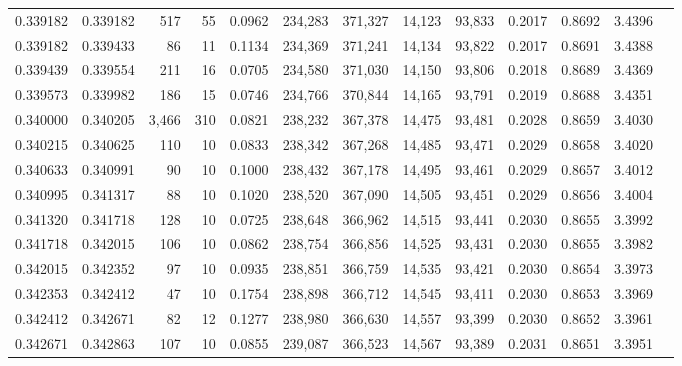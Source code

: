\begin{tabular}{rrrrrrrrrrrrr}
0.339182 & 0.339182 &   517 &  55 &                                     0.0962 & 234,283 & 371,327 &  14,123 &  93,833 & 0.2017 & 0.8692 & 3.4396 \\
0.339182 & 0.339433 &    86 &  11 &                                     0.1134 & 234,369 & 371,241 &  14,134 &  93,822 & 0.2017 & 0.8691 & 3.4388 \\
0.339439 & 0.339554 &   211 &  16 &                                     0.0705 & 234,580 & 371,030 &  14,150 &  93,806 & 0.2018 & 0.8689 & 3.4369 \\
0.339573 & 0.339982 &   186 &  15 &                                     0.0746 & 234,766 & 370,844 &  14,165 &  93,791 & 0.2019 & 0.8688 & 3.4351 \\
0.340000 & 0.340205 & 3,466 & 310 &                                     0.0821 & 238,232 & 367,378 &  14,475 &  93,481 & 0.2028 & 0.8659 & 3.4030 \\
0.340215 & 0.340625 &   110 &  10 &                                     0.0833 & 238,342 & 367,268 &  14,485 &  93,471 & 0.2029 & 0.8658 & 3.4020 \\
0.340633 & 0.340991 &    90 &  10 &                                     0.1000 & 238,432 & 367,178 &  14,495 &  93,461 & 0.2029 & 0.8657 & 3.4012 \\
0.340995 & 0.341317 &    88 &  10 &                                     0.1020 & 238,520 & 367,090 &  14,505 &  93,451 & 0.2029 & 0.8656 & 3.4004 \\
0.341320 & 0.341718 &   128 &  10 &                                     0.0725 & 238,648 & 366,962 &  14,515 &  93,441 & 0.2030 & 0.8655 & 3.3992 \\
0.341718 & 0.342015 &   106 &  10 &                                     0.0862 & 238,754 & 366,856 &  14,525 &  93,431 & 0.2030 & 0.8655 & 3.3982 \\
0.342015 & 0.342352 &    97 &  10 &                                     0.0935 & 238,851 & 366,759 &  14,535 &  93,421 & 0.2030 & 0.8654 & 3.3973 \\
0.342353 & 0.342412 &    47 &  10 &                                     0.1754 & 238,898 & 366,712 &  14,545 &  93,411 & 0.2030 & 0.8653 & 3.3969 \\
0.342412 & 0.342671 &    82 &  12 &                                     0.1277 & 238,980 & 366,630 &  14,557 &  93,399 & 0.2030 & 0.8652 & 3.3961 \\
0.342671 & 0.342863 &   107 &  10 &                                     0.0855 & 239,087 & 366,523 &  14,567 &  93,389 & 0.2031 & 0.8651 & 3.3951 \\

\end{tabular}
